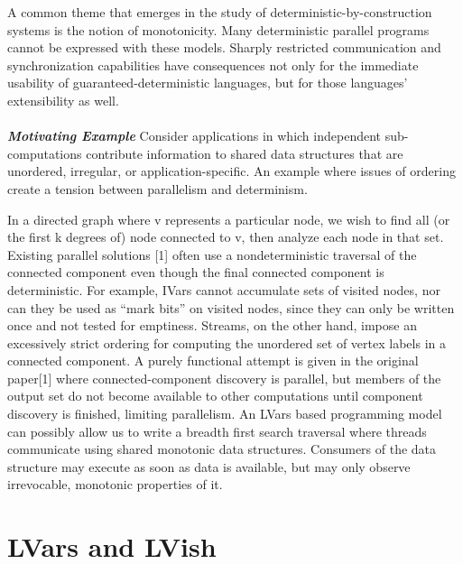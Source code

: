 \documentclass[twocolumn]{article}
\begin{document}
A common theme that emerges in the study of deterministic-by-construction systems is the notion of monotonicity. Many deterministic parallel programs cannot be expressed with these models. Sharply restricted communication and synchronization capabilities have consequences not only for the immediate usability of guaranteed-deterministic languages, but for those languages’ extensibility as well.
\\ \\ 
\textit{\textbf{Motivating Example}} Consider applications in which independent sub-computations contribute information to shared data structures that are unordered, irregular, or application-specific. An example where issues of ordering create a tension between parallelism and determinism. \par 
In a directed graph where v represents a particular node, we wish to find all (or the first k degrees of) node connected to v, then analyze each node in that set. Existing parallel solutions [1] often use a nondeterministic traversal of the connected component even though the final connected component is deterministic. For example, IVars cannot accumulate sets of visited nodes, nor can they be used as “mark bits” on visited nodes, since they can only be written once and not tested for emptiness. Streams, on the other hand, impose an excessively strict ordering for computing the unordered set of vertex labels in a connected component. A purely functional attempt is given in the original paper[1] where connected-component discovery is parallel, but members of the output set do not become available to other computations until component discovery is finished, limiting parallelism. 
An LVars based programming model can possibly allow us to write a breadth first search traversal where threads communicate using shared monotonic data structures. Consumers of the data structure may execute as soon as data is available, but may only observe irrevocable, monotonic properties of it. 

\section{LVars and LVish}
\end{document}
